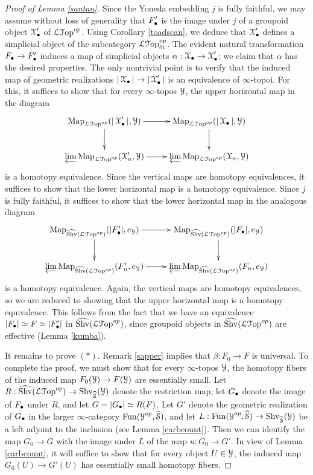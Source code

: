 \begin{proof}[Proof of Lemma \ref{santan}]
Since the Yoneda embedding $j$ is fully faithful, we may assume without loss of generality
that $F'_{\bullet}$ is the image under $j$ of a groupoid object $\operatorname{\mathcal{X}}'_{\bullet}$ of
$\operatorname{\mathcal{L}{\mathcal T}op}^{op}$. Using Corollary \ref{toadscan}, we deduce that $\operatorname{\mathcal{X}}'_{\bullet}$ 
defines a simplicial object of the subcategory $\operatorname{\mathcal{L}{\mathcal T}op}^{op}_{\text{\'{e}t}}$. The evident
natural transformation $F_{\bullet} \rightarrow F'_{\bullet}$ induces a map of
simplicial objects $\alpha: \operatorname{\mathcal{X}}_{\bullet} \rightarrow \operatorname{\mathcal{X}}'_{\bullet}$; we claim that $\alpha$ has the desired properties. The only nontrivial point is to verify that the induced map of geometric realizations
$| \operatorname{\mathcal{X}}_{\bullet} | \rightarrow | \operatorname{\mathcal{X}}'_{\bullet} |$ is an equivalence of $\infty$-topoi. For this, it suffices to show that for every $\infty$-topos $\operatorname{\mathcal{Y}}$, the upper horizontal map in the diagram
$$\xymatrix{ \bHom_{ \LGeom^{op} }( | \calX'_{\bigdot} |, \calY) \ar[r] \ar[d] & \bHom_{ \LGeom^{op} }( | \calX_{\bigdot } |, \calY) \ar[d] \\
\varprojlim \bHom_{ \LGeom^{op} }( \calX'_{n}, \calY) \ar[r] & \varprojlim \bHom_{ \LGeom^{op} }( \calX_{n}, \calY ) }$$
is a homotopy equivalence. Since the vertical maps are homotopy equivalences, it suffices to show that the lower horizontal map is a homotopy equivalence. Since $j$ is fully faithful, it suffices to show that the lower horizontal map in the analogous diagram
$$\xymatrix{ \bHom_{ \widehat{\Shv}(\LGeom^{op}) }( | F'_{\bigdot} |, e_{\calY}) \ar[r] \ar[d] & \bHom_{ \widehat{\Shv}(\LGeom^{op})}( | F_{\bigdot } |, e_{\calY}) \ar[d] \\
\varprojlim \bHom_{ \widehat{\Shv}(\LGeom^{op})}( F'_{n}, e_{\calY}) \ar[r] & \varprojlim \bHom_{ \widehat{\Shv}(\LGeom^{op}) }( F_{n}, e_{\calY} ) }$$
is a homotopy equivalence. Again, the vertical maps are homotopy equivalences, so we are reduced to showing that the upper horizontal map is a homotopy equivalence. This follows from the fact that we have an equivalence $|F_{\bullet}| \simeq F \simeq |F'_{\bullet}|$ in $\widehat{\operatorname{Shv}}( \operatorname{\mathcal{L}{\mathcal T}op}^{op} )$, since groupoid objects in $\widehat{\operatorname{Shv}}(\operatorname{\mathcal{L}{\mathcal T}op}^{op})$ are effective (Lemma \ref{kumba}).

It remains to prove $(\ast)$. Remark \ref{sapper} implies that $\beta: F_0 \rightarrow F$ is universal.
To complete the proof, we must show that for every $\infty$-topos $\operatorname{\mathcal{Y}}$, the homotopy fibers
of the induced map $F_0( \operatorname{\mathcal{Y}}) \rightarrow F(\operatorname{\mathcal{Y}})$ are essentially small. Let
$R: \widehat{\operatorname{Shv}}( \operatorname{\mathcal{L}{\mathcal T}op}^{op}) \rightarrow \operatorname{Shv}_{ \widehat{\operatorname{\mathcal{S}}}}( \operatorname{\mathcal{Y}})$ denote the restriction map,
let $G_{\bullet}$ denote the image of $F_{\bullet}$ under $R$, and let $G = | G_{\bullet} | \simeq R(F)$. Let $G'$ denote the geometric realization of $G_{\bullet}$ in the larger $\infty$-category
$\operatorname{Fun}( \operatorname{\mathcal{Y}}^{op}, \widehat{\operatorname{\mathcal{S}}})$, and let $L: \operatorname{Fun}( \operatorname{\mathcal{Y}}^{op}, \widehat{\operatorname{\mathcal{S}}} ) \rightarrow \operatorname{Shv}_{ \widehat{\operatorname{\mathcal{S}}} }(\operatorname{\mathcal{Y}})$ be a left adjoint to the inclusion (see Lemma \ref{carbcount}). Then we can identify the map $G_0 \rightarrow G$ with the image under $L$ of the map $u: G_0 \rightarrow G'$. In view of Lemma \ref{carbcount}, it will suffice to show that for every object $U \in \operatorname{\mathcal{Y}}$, the induced map $G_0(U) \rightarrow G'(U)$ has essentially small homotopy fibers.


\end{proof}
